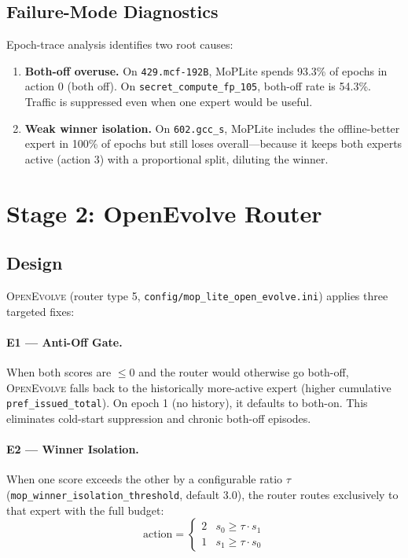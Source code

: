 \documentclass[10pt,twocolumn]{article}
\begin{document}
\subsection{Failure-Mode Diagnostics}

Epoch-trace analysis identifies two root causes:

\begin{enumerate}
  \item \textbf{Both-off overuse.} On \texttt{429.mcf-192B}, MoPLite spends 93.3\%
    of epochs in action 0 (both off). On \texttt{secret\_compute\_fp\_105}, both-off
    rate is 54.3\%. Traffic is suppressed even when one expert would be useful.

  \item \textbf{Weak winner isolation.} On \texttt{602.gcc\_s}, MoPLite includes the
    offline-better expert in 100\% of epochs but still loses overall—because it keeps
    both experts active (action 3) with a proportional split, diluting the winner.
\end{enumerate}

\section{Stage 2: OpenEvolve Router}
\label{sec:stage2}

\subsection{Design}

\textsc{OpenEvolve} (router type 5, \texttt{config/mop\_lite\_open\_evolve.ini})
applies three targeted fixes:

\paragraph{E1 — Anti-Off Gate.} When both scores are $\leq 0$ and the router would
otherwise go both-off, \textsc{OpenEvolve} falls back to the historically more-active
expert (higher cumulative \texttt{pref\_issued\_total}). On epoch 1 (no history),
it defaults to both-on. This eliminates cold-start suppression and chronic both-off
episodes.

\paragraph{E2 — Winner Isolation.} When one score exceeds the other by a configurable
ratio $\tau$ (\texttt{mop\_winner\_isolation\_threshold}, default 3.0), the router
routes exclusively to that expert with the full budget:
\[
  \text{action} = \begin{cases} 2 & s_0 \geq \tau \cdot s_1 \\ 1 & s_1 \geq \tau \cdot s_0 \end{cases}
\]
\end{document}
